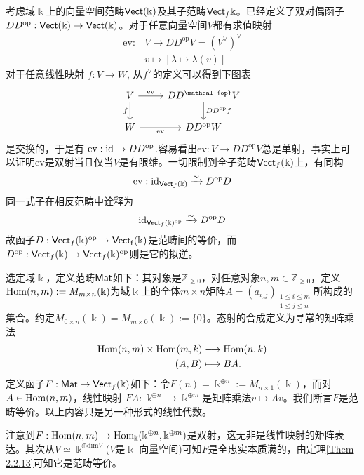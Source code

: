 \begin{Exap}
    考虑域$\Bbbk$上的向量空间范畴$\mathsf{Vect}(\Bbbk)$及其子范畴$\mathsf{Vect}_f \Bbbk$。已经定义了双对偶函子$DD^{\mathrm{op}}:\mathsf{Vect}(\Bbbk)\to \mathsf{Vect}(\Bbbk)$。对于任意向量空间$V$都有求值映射
    \begin{align*}
        \mathrm{ev}:& V \longrightarrow D D^{\mathrm{op}}V=(V^{\vee})^{\vee} \\
                    & v \longmapsto [\lambda \mapsto \lambda(v)]
    \end{align*}
    对于任意线性映射 $f:V\rightarrow W$, 从$f^{\vee}$的定义可以得到下图表
    \[\begin{tikzcd}
        V
            \arrow[d, "f"']
            \arrow[r, "\mathrm{ev}"] &
        D D^{\mathcal{op}} V
            \arrow[d, "D D^{\mathrm{op}} f"] \\
        W
            \arrow[r, "\mathrm{ev}"'] &
        D D^{\mathrm{op}} W
    \end{tikzcd}\]
    是交换的，于是有 $\mathrm{ev}:\mathrm{id} \to D D^{\mathrm{op}}$.容易看出$\mathrm{ev}: V \to D D^{\mathrm{op}}V$总是单射，事实上可以证明$\mathrm{ev}$是双射当且仅当$V$是有限维。一切限制到全子范畴$\mathsf{Vect}_f(\Bbbk)$上，有同构
    \[
        \mathrm{ev}:\mathrm{id}_{\mathsf{Vect}_f(\Bbbk)} \xrightarrow{\sim}D^{\mathrm{op}}D
    \]
    同一式子在相反范畴中诠释为
    \[
        \mathrm{id}_{\mathsf{Vect}_f (\Bbbk)^{\mathrm{op}}} \xrightarrow{\sim} D^{\mathrm{op}}D
    \]
    故函子$D:\mathsf{Vect}_{f}(\Bbbk)^{\mathrm{op}} \to \mathsf{Vect_{f}(\Bbbk)}$是范畴间的等价，而$D^{\mathrm{op}}:\mathsf{Vect}_{f}(\Bbbk) \to \mathsf{Vect}_{f}(\Bbbk)^{\mathrm{op}}$则是它的拟逆。
\end{Exap}

\begin{Exap}
    选定域$\Bbbk$，定义范畴$\mathsf{Mat}$如下：其对象是$\mathbb{Z}_{\geq 0}$，对任意对象$n,m \in \mathbb{Z}_{\geq 0}$，定义$\operatorname{Hom}(n,m):=M_{m\times n}(\Bbbk)$为域$\Bbbk$上的全体$m\times n$矩阵$A=(a_{i,j})_{\substack{1 \leq i \leq m \\ 1 \leq j \leq n}}$所构成的集合。约定$M_{0 \times n}(\Bbbk)=M_{m\times 0}(\Bbbk):=\{0\}$。态射的合成定义为寻常的矩阵乘法
    \begin{align*}
        \operatorname{Hom}(n,m)\times \operatorname{Hom}(m,k) &\longrightarrow \operatorname{Hom}(n,k) \\
        (A,B) &\longmapsto B A.
    \end{align*}
    定义函子$F:\mathsf{Mat} \to \mathsf{Vect}_f(\Bbbk)$如下：令$F(n)=\Bbbk^{\oplus n}:= M_{n\times 1}(\Bbbk)$，而对 $A\in \operatorname{Hom}(n,m)$，线性映射 $FA:\Bbbk^{\oplus n} \to \Bbbk^{\oplus m}$是矩阵乘法$v \mapsto A v$。我们断言$F$是范畴等价。以上内容只是另一种形式的线性代数。
    
    注意到$F:\operatorname{Hom}(n,m) \to \operatorname{Hom}_{\Bbbk}(\Bbbk^{\oplus n}, \Bbbk^{\oplus m})$是双射，这无非是线性映射的矩阵表达。其次从$V\simeq \Bbbk^{\oplus \mathrm{dim} V}$($V$是$\Bbbk$-向量空间)可知$F$是全忠实本质满的，由定理\ref{Them 2.2.13}可知它是范畴等价。
\end{Exap}

